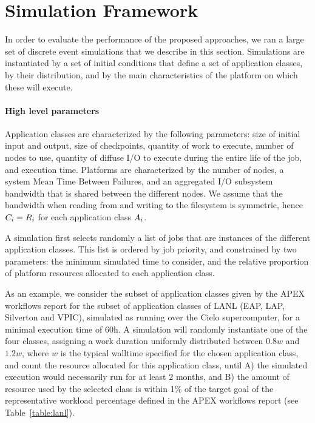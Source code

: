 
\section{Simulation Framework}
\label{sec:simulator}

In order to evaluate the performance of the proposed approaches, we ran
a large set of discrete event simulations that we describe in this
section. Simulations are instantiated by a set of initial conditions
that define a set of application classes, by their distribution, and by
the main characteristics of the platform on which these will execute.

\paragraph*{High level parameters}
Application classes are characterized by the following parameters:
size of initial input and output, size of checkpoints, quantity of
work to execute, number of nodes to use, quantity of diffuse I/O to
execute during the entire life of the job, and execution time.
Platforms are characterized by the number of nodes, a system Mean Time
Between Failures, and an aggregated I/O subsystem bandwidth that is
shared between the different nodes. We assume that the bandwidth when
reading from and writing to the filesystem is symmetric, hence
$C_{i}=R_{i}$ for each application class $A_{i}$.

A simulation first selects randomly a list of jobs that are instances
of the different application classes. This list is ordered by job
priority, and constrained by two parameters: the minimum simulated
time to consider, and the relative proportion of platform resources
allocated to each application class.

As an example, we consider the subset of application classes given by
the APEX workflows report for the subset of application classes of
LANL (EAP, LAP, Silverton and VPIC), simulated as running over the
Cielo supercomputer, for a minimal execution time of 60h. A simulation
will randomly instantiate one of the four classes, assigning a work
duration uniformly distributed between $0.8w$ and $1.2w$, where $w$ is
the typical walltime specified for the chosen application class, and
count the resource allocated for this application class, until A) the
simulated execution would necessarily run for at least 2 months, and B) the
amount of resource used by the selected class is within 1\% of the
target goal of the representative workload percentage defined in the
APEX workflows report (see Table~\ref{table:lanl}).


